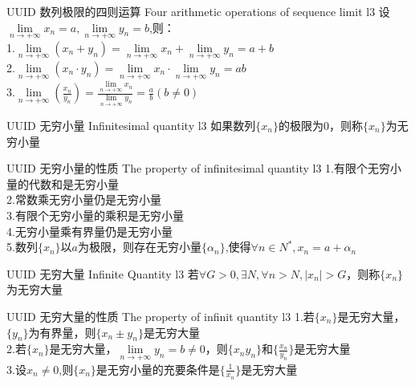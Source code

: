 \documentclass[UTF8, 10pt]{ctexart}
\begin{document}
        \begin{thm}
            {UUID}
            {数列极限的四则运算}
            {Four arithmetic operations of sequence limit}
            {l3}
            设$\lim\limits_{n \to + \infty} x_n =a , \lim\limits_{n \to + \infty} y_n =b$,则：
            \\
            1.$\lim\limits_{n \to + \infty} (x_n + y_n) = \lim\limits_{n \to + \infty} x_n + \lim\limits_{n \to + \infty} y_n = a + b$
            \\
            2.$\lim\limits_{n \to + \infty} (x_n \cdot y_n) = \lim\limits_{n \to + \infty} x_n \cdot \lim\limits_{n \to + \infty} y_n = ab$
            \\
            3.$\lim\limits_{n \to + \infty} (\frac{x_n}{y_n}) = \frac{\lim\limits_{n \to + \infty} x_n}{\lim\limits_{n \to + \infty} y_n} = \frac{a}{b} (b \neq 0)$
        \end{thm}

        \begin{dfn}
            {UUID}
            {无穷小量}
            {Infinitesimal quantity}
            {l3}
            如果数列$\{ x_n \}$的极限为0，则称$\{ x_n \}$为无穷小量
        \end{dfn}
        \begin{ppt}
            {UUID}
            {无穷小量的性质}
            {The property of infinitesimal quantity}
            {l3}
            1.有限个无穷小量的代数和是无穷小量
            \\
            2.常数乘无穷小量仍是无穷小量
            \\
            3.有限个无穷小量的乘积是无穷小量
            \\
            4.无穷小量乘有界量仍是无穷小量
            \\
            5.数列$\{ x_n\}$以$a$为极限，则存在无穷小量$\{ \alpha_n \}$,使得$\forall n \in N^* , x_n = a + \alpha_n$
        \end{ppt}

        \begin{dfn}
            {UUID}
            {无穷大量}
            {Infinite Quantity}
            {l3}
            若$\forall G>0 , \exists N,\forall n > N,|x_n| > G$，则称$\{ x_n \}$为无穷大量
        \end{dfn}

        \begin{ppt}
            {UUID}
            {无穷大量的性质}
            {The property of infinit quantity}
            {l3}
            1.若$\{ x_n \}$是无穷大量，$\{ y_n \}$为有界量，则$\{ x_n \pm y_n \}$是无穷大量
            \\
            2.若$\{ x_n \}$是无穷大量，$\lim\limits_{n \to + \infty} y_n = b \neq 0$，则$\{ x_ny_n \}$和$\{ \frac{x_n}{y_n} \}$是无穷大量
            \\
            3.设$x_n \neq 0$,则$\{ x_n \}$是无穷小量的充要条件是$\{ \frac{1}{x_n} \}$是无穷大量
        \end{ppt}
\end{document}
